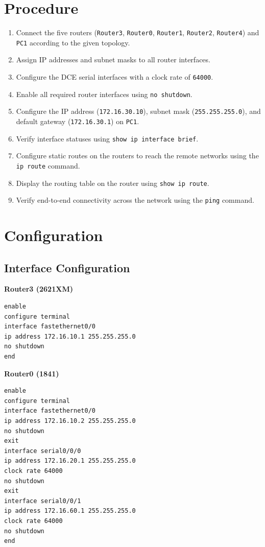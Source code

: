 \documentclass[12pt, a4paper]{report}
\begin{document}
\section*{Procedure}
\begin{enumerate}
	\item Connect the five routers (\texttt{Router3}, \texttt{Router0}, \texttt{Router1}, \texttt{Router2}, \texttt{Router4}) and \texttt{PC1} according to the given topology.
	\item Assign IP addresses and subnet masks to all router interfaces.
	\item Configure the DCE serial interfaces with a clock rate of \texttt{64000}.
	\item Enable all required router interfaces using \texttt{no shutdown}.
	\item Configure the IP address (\texttt{172.16.30.10}), subnet mask (\texttt{255.255.255.0}), and default gateway (\texttt{172.16.30.1}) on \texttt{PC1}.
	\item Verify interface statuses using \texttt{show ip interface brief}.
	\item Configure static routes on the routers to reach the remote networks using the \texttt{ip route} command.
	\item Display the routing table on the router using \texttt{show ip route}.
	\item Verify end-to-end connectivity across the network using the \texttt{ping} command.
\end{enumerate}

\section*{Configuration}

\subsection*{Interface Configuration}
\textbf{Router3 (2621XM)}
\begin{lstlisting}
enable
configure terminal
interface fastethernet0/0
ip address 172.16.10.1 255.255.255.0
no shutdown
end
\end{lstlisting}

\textbf{Router0 (1841)}
\begin{lstlisting}
enable
configure terminal
interface fastethernet0/0
ip address 172.16.10.2 255.255.255.0
no shutdown
exit
interface serial0/0/0
ip address 172.16.20.1 255.255.255.0
clock rate 64000
no shutdown
exit
interface serial0/0/1
ip address 172.16.60.1 255.255.255.0
clock rate 64000
no shutdown
end
\end{lstlisting}
\end{document}
